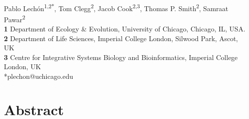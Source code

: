 \documentclass[10pt,letterpaper]{article}
\begin{document}
\vspace*{0.2in}

\begin{flushleft}
{\Large
\textbf{}
}
\newline
\\
Pablo Lechón\textsuperscript{1,2*},
Tom Clegg\textsuperscript{2},
Jacob Cook\textsuperscript{2,3},
Thomas P. Smith\textsuperscript{2},
Samraat Pawar\textsuperscript{2}
\\
\bigskip
\textbf{1} Department of Ecology \& Evolution, University of Chicago, Chicago, IL, USA.
\\
\textbf{2} Department of Life Sciences, Imperial College London, Silwood Park, Ascot, UK
\\
\textbf{3} Centre for Integrative Systems Biology and Bioinformatics, Imperial College London, UK
\\


\bigskip
*plechon@uchicago.edu

\end{flushleft}

\section*{Abstract}
\end{document}
